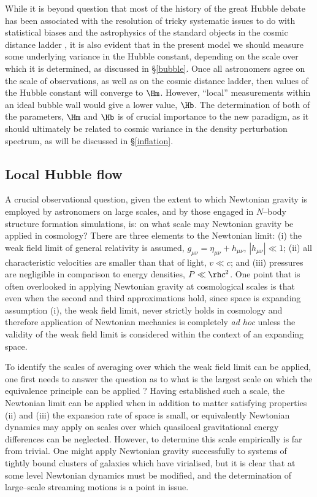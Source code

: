 \documentclass[12pt]{iopart}
\begin{document}
While it is beyond question that most of the history of the great Hubble
debate has been associated with the resolution of tricky systematic issues
to do with statistical biases and the astrophysics of the standard objects
in the cosmic distance ladder \cite{Tamm}, it is also evident that in the
present model we should measure some underlying variance in the Hubble
constant, depending on the scale over which it is determined, as
discussed in \S\ref{bubble}. Once all astronomers agree on the scale of
observations, as well as on the cosmic distance ladder, then values of
the Hubble constant will converge to $\Hm$. However, ``local'' measurements
within an ideal bubble wall would give a lower value, $\Hb$.
The determination of both of the parameters, $\Hm$ and $\Hb$
is of crucial importance to the new paradigm, as it should ultimately be
related to cosmic variance in the density perturbation spectrum, as will
be discussed in \S\ref{inflation}.

\subsection{Local Hubble flow\label{local}}

A crucial observational question, given the extent to which Newtonian gravity
is employed by astronomers on large scales, and by those engaged in $N$--body
structure formation simulations, is: on what scale may Newtonian gravity
be applied in cosmology? There are three elements to the Newtonian limit:
(i) the weak field limit of general relativity is assumed, $g_{\mu\nu}=
\eta_{\mu\nu}+h_{\mu\nu}$, $\left|h_{\mu\nu}\right|\ll1$; (ii) all
characteristic velocities are smaller than that of light, $v\ll c$; and
(iii) pressures are negligible in comparison to energy densities,
$P\ll\rh c^2$. One point that is often overlooked in applying Newtonian gravity
at cosmological scales is that even when the second and third approximations
hold, since space is expanding assumption (i), the weak field limit,
never strictly holds in cosmology and therefore application of Newtonian
mechanics is completely {\em ad hoc} unless the validity of the weak
field limit is considered within the context of an expanding space.

To identify the scales of averaging over which the weak field limit can be
applied, one first needs to answer the question as to what is the largest
scale on which the equivalence principle can be applied \cite{equiv}?
Having established such a scale, the
Newtonian limit can be applied when in addition to matter satisfying
properties (ii) and (iii) the expansion rate of space is small,
or equivalently Newtonian dynamics may apply on scales over which
quasilocal gravitational energy differences can be neglected.
However, to determine this scale empirically is far from trivial.
One might apply Newtonian gravity successfully to systems of tightly bound
clusters of galaxies which have virialised, but it is clear that at
some level Newtonian dynamics must be modified, and the determination
of large--scale streaming motions is a point in issue.
\end{document}
